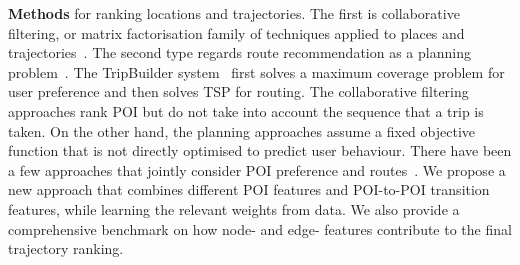 {\bf Methods} for ranking locations and trajectories.
The first is collaborative filtering, or matrix factorisation family of techniques applied to places and trajectories~\cite{shi2011personalized,ijcai13,zhang2015location}. The second type regards route recommendation as a planning problem~\cite{gioniswsdm14,ijcai15}.
The TripBuilder system~\cite{brilhante2013shall} first solves a maximum coverage problem for user preference and then solves TSP for routing. The collaborative filtering approaches rank POI but do not take into account the sequence that a trip is taken. On the other hand, the planning approaches assume a fixed objective function that is not directly optimised to predict user behaviour. There have been a few approaches that jointly consider POI preference and routes~\cite{lu2012personalized, kurashima2010geotag,chen2015tripplanner}.
We propose a new approach that combines different POI features and POI-to-POI transition features, while learning the relevant weights from data. We also provide a comprehensive benchmark on how node- and edge- features contribute to the final trajectory ranking.




